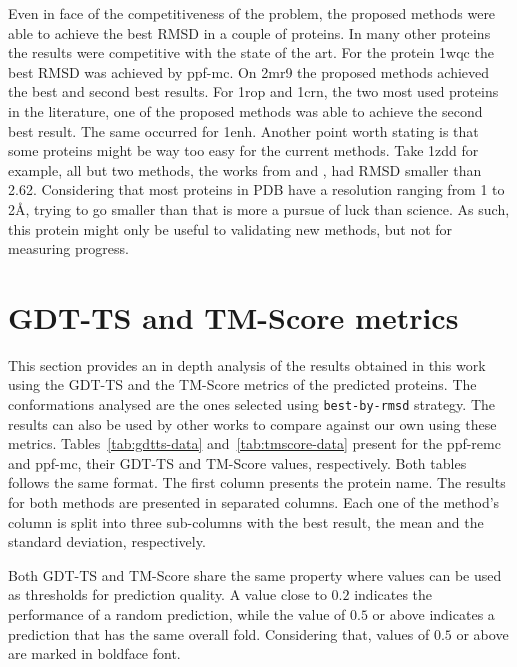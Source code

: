 Even in face of the competitiveness of the problem, the proposed methods were
able to achieve the best RMSD in a couple of proteins. In many other proteins
the results were competitive with the state of the art. For the protein 1wqc
the best RMSD was achieved by ppf-mc. On 2mr9 the proposed methods
achieved the best and second best results. For 1rop and 1crn, the two most used
proteins in the literature, one of the proposed methods was able to achieve
the second best result. The same occurred for 1enh. Another point worth stating
is that some proteins might be way too easy for the current methods. Take 1zdd
for example, all but two methods, the works from 
and , had RMSD smaller than 2.62. Considering that
most proteins in PDB have a resolution ranging from 1 to 2\AA, trying to go
smaller than that is more a pursue of luck than science. As such, this protein
might only be useful to validating new methods, but not for measuring progress.

\section{GDT-TS and TM-Score metrics}
\label{sec:other-metrics}

This section provides an in depth analysis of the results obtained in this
work using the GDT-TS and the TM-Score metrics of the predicted proteins.
The conformations analysed are the ones selected using \texttt{best-by-rmsd} strategy.
The results can also be used by other works to compare against our own using
these metrics. Tables~\ref{tab:gdtts-data} and~\ref{tab:tmscore-data} present
for the ppf-remc and ppf-mc, their
GDT-TS and TM-Score values, respectively. Both tables follows the same format. The
first column presents the protein name. The results for both methods are
presented in separated columns. Each one of the
method's column is split into three sub-columns with the best result, the mean
and the standard deviation, respectively.

Both GDT-TS and TM-Score share the same property where values can be used as
thresholds for prediction quality. A value close to $0.2$ indicates the performance of
a random prediction, while the value of $0.5$ or above indicates a prediction that has
the same overall fold. Considering that, values of $0.5$ or above are marked
in boldface font.

